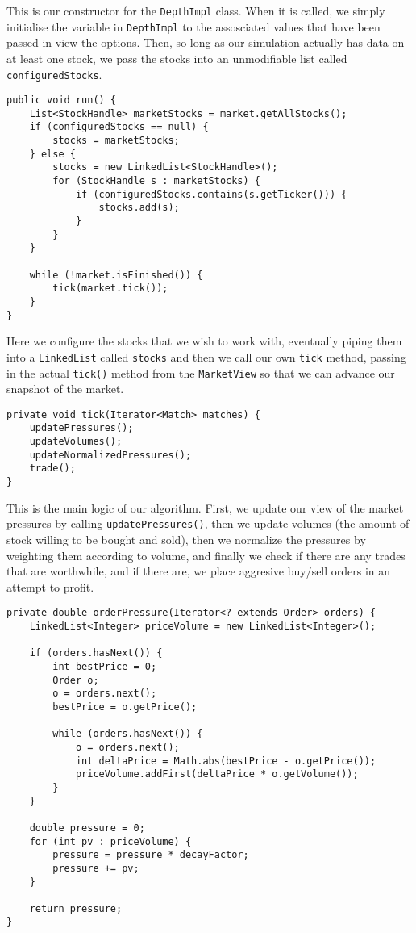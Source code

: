\documentclass[11pt]{article}
\begin{document}
This is our constructor for the \texttt{DepthImpl} class. When it is called, we simply initialise the variable in \texttt{DepthImpl} to the assosciated values that have been passed in view the options. Then, so long as our simulation actually has data on at least one stock, we pass the stocks into an unmodifiable list called \texttt{configuredStocks}.\\
\begin{lstlisting}
public void run() {
	List<StockHandle> marketStocks = market.getAllStocks();
	if (configuredStocks == null) {
		stocks = marketStocks;
	} else {
		stocks = new LinkedList<StockHandle>();
		for (StockHandle s : marketStocks) {
			if (configuredStocks.contains(s.getTicker())) {
				stocks.add(s);
			}
		}
	}
	
	while (!market.isFinished()) {
		tick(market.tick());
	}
}
\end{lstlisting}
Here we configure the stocks that we wish to work with, eventually piping them into a \texttt{LinkedList} called \texttt{stocks} and then we call our own \texttt{tick} method, passing in the actual \texttt{tick()} method from the \texttt{MarketView} so that we can advance our snapshot of the market.\\
\begin{lstlisting}
private void tick(Iterator<Match> matches) {
	updatePressures();
	updateVolumes();
	updateNormalizedPressures();
	trade();
}
\end{lstlisting}
This is the main logic of our algorithm. First, we update our view of the market pressures by calling \texttt{updatePressures()}, then we update volumes (the amount of stock willing to be bought and sold), then we normalize the pressures by weighting them according to volume, and finally we check if there are any trades that are worthwhile, and if there are, we place aggresive buy/sell orders in an attempt to profit.\\
\begin{lstlisting}
private double orderPressure(Iterator<? extends Order> orders) {
	LinkedList<Integer> priceVolume = new LinkedList<Integer>();		
	
	if (orders.hasNext()) {
		int bestPrice = 0;
		Order o;
		o = orders.next();
		bestPrice = o.getPrice();
		
		while (orders.hasNext()) {
			o = orders.next();
			int deltaPrice = Math.abs(bestPrice - o.getPrice());
			priceVolume.addFirst(deltaPrice * o.getVolume());	
		}
	}
	
	double pressure = 0;
	for (int pv : priceVolume) {
		pressure = pressure * decayFactor;
		pressure += pv;
	}
	
	return pressure;
}
\end{lstlisting}
\end{document}

